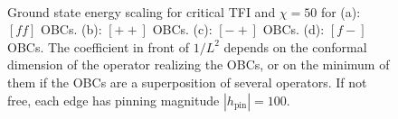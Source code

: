 \begin{figure}[h!]
		\hspace{-0.5cm}
		\begin{minipage}{\linewidth}
			\
		\end{minipage}
		\caption{Ground state energy scaling for critical TFI and $\chi=50$ for (a): $[ff]$ OBCs. (b): $[++]$ OBCs. (c): $[-+]$ OBCs. (d): $[f-]$ OBCs. The coefficient in front of $1/L^2$ depends on the conformal dimension of the operator realizing the OBCs, or on the minimum of them if the OBCs are a superposition of several operators. If not free, each edge has pinning magnitude $|h_\text{pin}|=100$.}
		\label{fig:gsSalingTFI}
	\end{figure}

